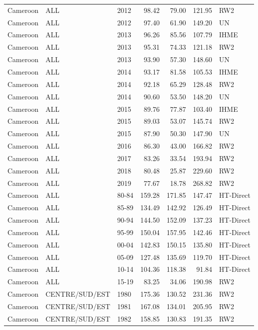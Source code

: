 \begin{longtable}{lllrrrl}
  Cameroon & ALL & 2012 & 98.42 & 79.00 & 121.95 & RW2 \\ 
  Cameroon & ALL & 2012 & 97.40 & 61.90 & 149.20 & UN \\ 
  Cameroon & ALL & 2013 & 96.26 & 85.56 & 107.79 & IHME \\ 
  Cameroon & ALL & 2013 & 95.31 & 74.33 & 121.18 & RW2 \\ 
  Cameroon & ALL & 2013 & 93.90 & 57.30 & 148.60 & UN \\ 
  Cameroon & ALL & 2014 & 93.17 & 81.58 & 105.53 & IHME \\ 
  Cameroon & ALL & 2014 & 92.18 & 65.29 & 128.48 & RW2 \\ 
  Cameroon & ALL & 2014 & 90.60 & 53.50 & 148.20 & UN \\ 
  Cameroon & ALL & 2015 & 89.76 & 77.87 & 103.40 & IHME \\ 
  Cameroon & ALL & 2015 & 89.03 & 53.07 & 145.74 & RW2 \\ 
  Cameroon & ALL & 2015 & 87.90 & 50.30 & 147.90 & UN \\ 
  Cameroon & ALL & 2016 & 86.30 & 43.00 & 166.82 & RW2 \\ 
  Cameroon & ALL & 2017 & 83.26 & 33.54 & 193.94 & RW2 \\ 
  Cameroon & ALL & 2018 & 80.48 & 25.87 & 229.60 & RW2 \\ 
  Cameroon & ALL & 2019 & 77.67 & 18.78 & 268.82 & RW2 \\ 
  Cameroon & ALL & 80-84 & 159.28 & 171.85 & 147.47 & HT-Direct \\ 
  Cameroon & ALL & 85-89 & 134.49 & 142.92 & 126.49 & HT-Direct \\ 
  Cameroon & ALL & 90-94 & 144.50 & 152.09 & 137.23 & HT-Direct \\ 
  Cameroon & ALL & 95-99 & 150.04 & 157.95 & 142.46 & HT-Direct \\ 
  Cameroon & ALL & 00-04 & 142.83 & 150.15 & 135.80 & HT-Direct \\ 
  Cameroon & ALL & 05-09 & 127.48 & 135.69 & 119.70 & HT-Direct \\ 
  Cameroon & ALL & 10-14 & 104.36 & 118.38 & 91.84 & HT-Direct \\ 
  Cameroon & ALL & 15-19 & 83.25 & 34.06 & 190.98 & RW2 \\ 
  Cameroon & CENTRE/SUD/EST & 1980 & 175.36 & 130.52 & 231.36 & RW2 \\ 
  Cameroon & CENTRE/SUD/EST & 1981 & 167.08 & 134.01 & 205.95 & RW2 \\ 
  Cameroon & CENTRE/SUD/EST & 1982 & 158.85 & 130.83 & 191.35 & RW2 \\ 

\end{longtable}
